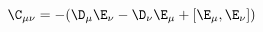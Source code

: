 \begin{equation}
\label{e5:43}
\C_{\mu \nu} = -(\D_{\mu} \E_{\nu} -\D_{\nu} \E_{\mu} +[\E_{\mu},\E_{\nu}])
\end{equation}

